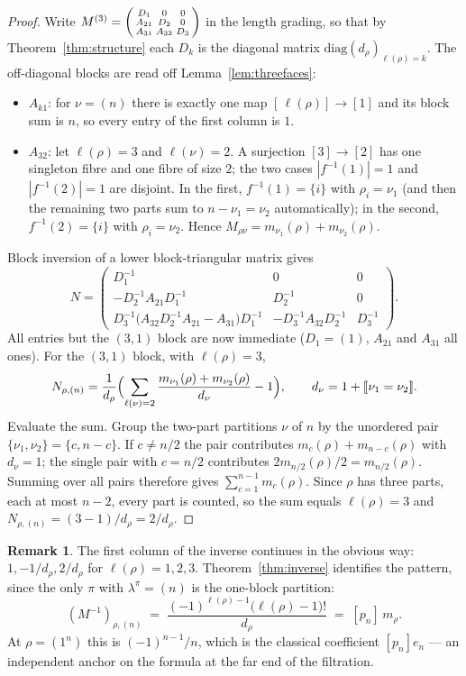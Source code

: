 \documentclass[11pt]{article}
\theoremstyle{definition}
\newtheorem{remark}[theorem]{Remark}
\newcommand{\bb}[1]{[\![#1]\!]}
\newcommand{\lam}{\lambda}
\begin{document}
\begin{proof}
Write $M^{(3)}=\begin{psmallmatrix}D_1&0&0\\ A_{21}&D_2&0\\ A_{31}&A_{32}&D_3\end{psmallmatrix}$ in
the length grading, so that by Theorem~\ref{thm:structure} each $D_k$ is the diagonal matrix
$\mathrm{diag}(d_\rho)_{\ell(\rho)=k}$. The off-diagonal blocks are read off
Lemma~\ref{lem:threefaces}:
\begin{itemize}
\item $A_{k1}$: for $\nu=(n)$ there is exactly one map $[\,\ell(\rho)]\to[1]$ and its block sum is
$n$, so every entry of the first column is $1$.
\item $A_{32}$: let $\ell(\rho)=3$ and $\ell(\nu)=2$. A surjection $[3]\to[2]$ has one singleton
fibre and one fibre of size $2$; the two cases $|f^{-1}(1)|=1$ and $|f^{-1}(2)|=1$ are disjoint. In
the first, $f^{-1}(1)=\{i\}$ with $\rho_i=\nu_1$ (and then the remaining two parts sum to
$n-\nu_1=\nu_2$ automatically); in the second, $f^{-1}(2)=\{i\}$ with $\rho_i=\nu_2$. Hence
$M_{\rho\nu}=m_{\nu_1}(\rho)+m_{\nu_2}(\rho)$.
\end{itemize}
Block inversion of a lower block-triangular matrix gives
\[
  N=\begin{pmatrix}
  D_1^{-1} & 0 & 0\\
  -D_2^{-1}A_{21}D_1^{-1} & D_2^{-1} & 0\\
  D_3^{-1}\bigl(A_{32}D_2^{-1}A_{21}-A_{31}\bigr)D_1^{-1} & -D_3^{-1}A_{32}D_2^{-1} & D_3^{-1}
  \end{pmatrix}.
\]
All entries but the $(3,1)$ block are now immediate ($D_1=(1)$, $A_{21}$ and $A_{31}$ all ones). For
the $(3,1)$ block, with $\ell(\rho)=3$,
\[
  N_{\rho,(n)}=\frac{1}{d_\rho}\Bigl(\sum_{\ell(\nu)=2}\frac{m_{\nu_1}(\rho)+m_{\nu_2}(\rho)}{d_\nu}-1\Bigr),
  \qquad d_\nu=1+\bb{\nu_1=\nu_2}.
\]
Evaluate the sum. Group the two-part partitions $\nu$ of $n$ by the unordered pair
$\{\nu_1,\nu_2\}=\{c,n-c\}$. If $c\ne n/2$ the pair contributes $m_c(\rho)+m_{n-c}(\rho)$ with
$d_\nu=1$; the single pair with $c=n/2$ contributes $2m_{n/2}(\rho)/2=m_{n/2}(\rho)$. Summing over
all pairs therefore gives $\sum_{c=1}^{n-1}m_c(\rho)$. Since $\rho$ has three parts, each at most
$n-2$, every part is counted, so the sum equals $\ell(\rho)=3$ and
$N_{\rho,(n)}=(3-1)/d_\rho=2/d_\rho$.
\end{proof}

\begin{remark}
The first column of the inverse continues in the obvious way: $1,-1/d_\rho,2/d_\rho$ for
$\ell(\rho)=1,2,3$. Theorem~\ref{thm:inverse} identifies the pattern, since the only $\pi$ with
$\lam^\pi=(n)$ is the one-block partition:
\[
  (M^{-1})_{\rho,(n)}\;=\;\frac{(-1)^{\ell(\rho)-1}\bigl(\ell(\rho)-1\bigr)!}{d_\rho}
  \;=\;[p_n]\,m_\rho .
\]
At $\rho=(1^n)$ this is $(-1)^{n-1}/n$, which is the classical coefficient $[p_n]e_n$ --- an
independent anchor on the formula at the far end of the filtration.
\end{remark}
\end{document}
